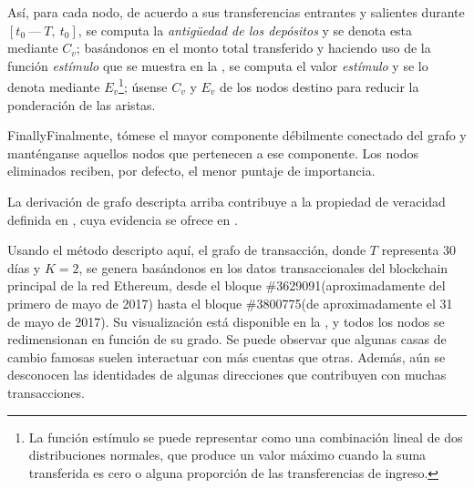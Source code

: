 Así, para cada nodo, de acuerdo a sus transferencias entrantes y salientes durante $[t_0\ —\ T,\ t_0]$, se computa la \textit{antigüedad de los depósitos} y se denota esta mediante $C_v$; basándonos en el monto total transferido y haciendo uso de la función \textit{estímulo} que se muestra en la , se computa el valor \textit{estímulo} y se lo denota mediante $E_v$\footnote{La función estímulo se puede representar como una combinación lineal de dos distribuciones normales, que produce un valor máximo cuando la suma transferida es cero o alguna proporción de las transferencias de ingreso.}; úsense $C_v$ y $E_v$ de los nodos destino para reducir la ponderación de las aristas.

FinallyFinalmente, tómese el mayor componente débilmente conectado del grafo y manténganse aquellos nodos que pertenecen a ese componente. Los nodos eliminados reciben, por defecto, el menor puntaje de importancia.

La derivación de grafo descripta arriba contribuye a la propiedad de veracidad definida en , cuya evidencia se ofrece en .

Usando el método descripto aquí, el grafo de transacción, donde $T$ representa 30 días y $K=2$, se genera basándonos en los datos transaccionales del blockchain principal de la red Ethereum, desde el bloque \#3629091(aproximadamente del primero de mayo de 2017) hasta el bloque \#3800775(de aproximadamente el 31 de mayo de 2017). Su visualización está disponible en la , y todos los nodos se redimensionan en función de su grado. Se puede observar que algunas casas de cambio famosas suelen interactuar con más cuentas que otras. Además, aún se desconocen las identidades de algunas direcciones que contribuyen con muchas transacciones.

